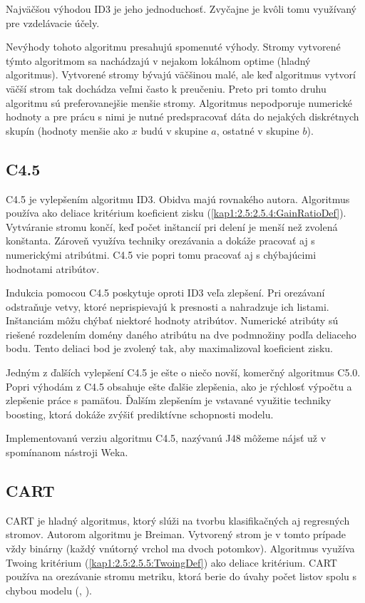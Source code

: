 Najväčšou výhodou ID3 je jeho jednoduchosť. Zvyčajne je kvôli tomu využívaný pre vzdelávacie účely. 

Nevýhody tohoto algoritmu presahujú spomenuté výhody. Stromy vytvorené týmto algoritmom sa nachádzajú v nejakom lokálnom optime (hladný algoritmus).
Vytvorené stromy bývajú väčšinou malé, ale keď algoritmus vytvorí väčší strom tak dochádza veľmi často k preučeniu. Preto pri tomto druhu algoritmu sú preferovanejšie menšie stromy. Algoritmus nepodporuje numerické hodnoty a pre prácu s nimi je nutné predspracovať dáta do nejakých diskrétnych skupín (hodnoty menšie ako $x$ budú v skupine $a$, ostatné v skupine $b$).
\subsection{C4.5}\label{kap1:2.7:2.7.4:C4.5}
C4.5 je vylepšením algoritmu ID3. Obidva majú rovnakého autora. Algoritmus používa ako deliace kritérium koeficient zisku (\ref{kap1:2.5:2.5.4:GainRatioDef}). Vytváranie stromu končí, keď počet inštancií pri delení je menší než zvolená konštanta. Zároveň využíva techniky orezávania a dokáže pracovať aj s numerickými atribútmi. C4.5 vie popri tomu  pracovať aj s chýbajúcimi hodnotami atribútov.

Indukcia pomocou C4.5 poskytuje oproti ID3 veľa zlepšení. Pri orezávaní odstraňuje vetvy, ktoré neprispievajú k presnosti a nahradzuje ich listami. Inštanciám môžu chýbať niektoré hodnoty atribútov. Numerické atribúty sú riešené rozdelením domény daného atribútu na dve podmnožiny podľa deliaceho bodu. Tento deliaci bod je zvolený tak, aby maximalizoval koeficient zisku.

Jedným z ďalších vylepšení C4.5 je ešte o niečo novší, komerčný algoritmus C5.0. Popri výhodám z C4.5 obsahuje ešte ďalšie zlepšenia, ako je rýchlosť výpočtu a zlepšenie práce s pamäťou. Ďalším zlepšením je vstavané využitie techniky boosting, ktorá dokáže zvýšiť prediktívne schopnosti modelu.

Implementovanú verziu algoritmu C4.5, nazývanú J48 môžeme nájsť už v spomínanom nástroji Weka.

\subsection{CART}\label{kap1:2.7:2.7.5:CART}
CART je hladný algoritmus, ktorý slúži na tvorbu klasifikačných aj regresných stromov. Autorom algoritmu je Breiman. Vytvorený strom je v tomto prípade vždy binárny (každý vnútorný vrchol ma dvoch potomkov). Algoritmus využíva Twoing kritérium (\ref{kap1:2.5:2.5.5:TwoingDef}) ako deliace kritérium. CART používa na orezávanie stromu metriku, ktorá berie do úvahy počet listov spolu s chybou modelu (\cite{wiki-costcompprune}, \cite[s.382]{kap1-DecisionTree}).

